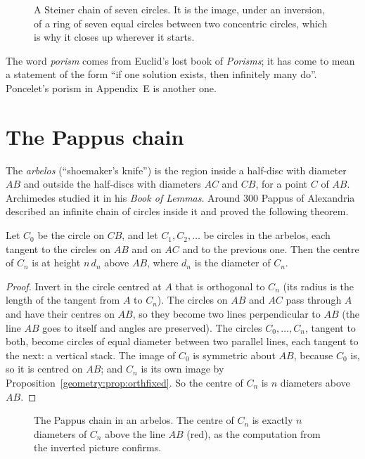 \begin{figure}[ht]
\centering
{}
\caption{A Steiner chain of seven circles. It is the image, under an inversion, of a ring of seven equal circles between two concentric
circles, which is why it closes up wherever it starts.}
\label{geometry:fig:steiner}
\end{figure}

The word \emph{porism} comes from Euclid's lost book of \emph{Porisms}; it has come to mean a statement of the form ``if one solution exists, then
infinitely many do''. Poncelet's porism in Appendix~E is another one.

\section{The Pappus chain}

The \emph{arbelos} (``shoemaker's knife'') is the region inside a half-disc with diameter $AB$ and outside the half-discs with diameters $AC$
and $CB$, for a point $C$ of $AB$. Archimedes studied it in his \emph{Book of Lemmas}. Around 300 Pappus of Alexandria described an infinite chain
of circles inside it and proved the following theorem.

\begin{theorem}[Pappus]\label{geometry:thm:pappus}
Let $C_0$ be the circle on $CB$, and let $C_1,C_2,\dots$ be circles in the arbelos, each tangent to the circles on $AB$ and on $AC$ and to the
previous one. Then the centre of $C_n$ is at height $n\,d_n$ above $AB$, where $d_n$ is the diameter of $C_n$.
\end{theorem}
\begin{proof}
Invert in the circle centred at $A$ that is orthogonal to $C_n$ (its radius is the length of the tangent from $A$ to $C_n$). The circles on
$AB$ and $AC$ pass through $A$ and have their centres on $AB$, so they become two lines perpendicular to $AB$ (the line $AB$ goes to itself and
angles are preserved). The circles $C_0,\dots,C_n$, tangent to both, become circles of equal diameter between two parallel lines, each tangent to
the next: a vertical stack. The image of $C_0$ is symmetric about $AB$, because $C_0$ is, so it is centred on $AB$; and $C_n$ is its own
image by Proposition~\ref{geometry:prop:orthfixed}. So the centre of $C_n$ is $n$ diameters above $AB$.
\end{proof}

\begin{figure}[ht]
\centering
{}
\caption{The Pappus chain in an arbelos. The centre of $C_n$ is exactly $n$ diameters of $C_n$ above the line $AB$ (red), as the computation
from the inverted picture confirms.}
\label{geometry:fig:pappus}
\end{figure}

